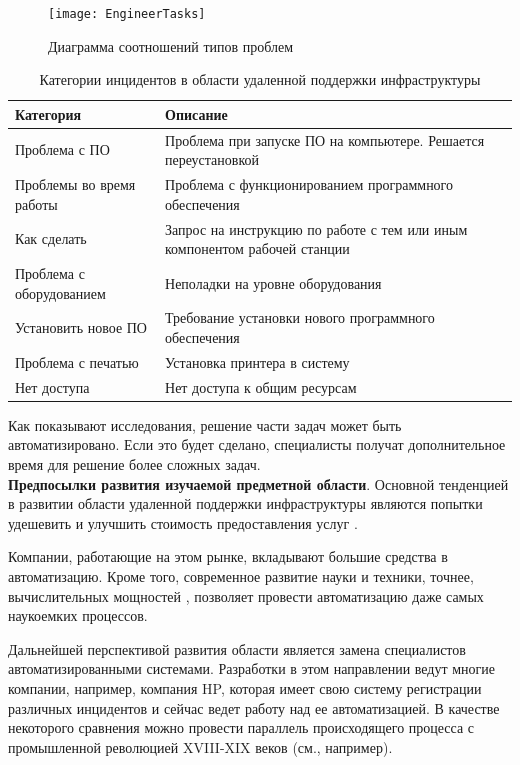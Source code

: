 \begin{figure} [h] 
  \center
  \texttt{[image: EngineerTasks]}
  \caption{Диаграмма соотношений типов проблем} 
  \label{img:EngineerTasks}  
\end{figure}

\begin{table} [htbp]
  \centering
  \parbox{15cm}{\caption{Категории инцидентов в области удаленной поддержки инфраструктуры}\label{IncidentDescription}}
  \begin{tabular}{| p{7cm} || p{7cm} |}
 
  \hline
\textbf{Категория} & \textbf{Описание} \\
  \hline
Проблема с ПО	& Проблема при запуске ПО на компьютере. Решается переустановкой \\
  \hline
Проблемы во время работы  & Проблема с функционированием программного обеспечения\\
    \hline
Как сделать & Запрос на инструкцию по работе с тем или иным компонентом рабочей станции \\
      \hline
Проблема с оборудованием  & Неполадки на уровне оборудования \\
  \hline
Установить новое ПО       & Требование установки нового программного обеспечения \\
  \hline
Проблема с печатью        & Установка принтера в систему \\
    \hline
Нет доступа               & Нет доступа к общим ресурсам \\
  \hline
  \end{tabular}
\end{table}

Как показывают исследования, решение части задач может быть автоматизировано. Если это будет сделано,  специалисты получат дополнительное время для решение более сложных задач. \\
\clearpage
\textbf{Предпосылки развития изучаемой предметной области}. 
Основной тенденцией в развитии области удаленной поддержки инфраструктуры являются попытки удешевить и улучшить стоимость предоставления услуг \cite{OutsourceEff}. \par
Компании, работающие на этом рынке, вкладывают большие средства в автоматизацию. Кроме того, современное развитие науки и техники, точнее, вычислительных мощностей \cite{SuperComputer}, позволяет провести автоматизацию даже самых наукоемких процессов. \par
Дальнейшей перспективой развития области является замена специалистов автоматизированными системами. Разработки в этом направлении ведут многие компании, например, компания HP, которая имеет свою систему регистрации различных инцидентов и сейчас ведет работу над ее автоматизацией. В качестве некоторого сравнения можно провести параллель происходящего процесса с промышленной революцией XVIII-XIX веков (см., например\cite{IndustrialRev}). \par

